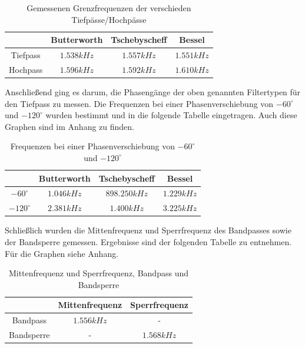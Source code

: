 	\begin{table}[h]
		\centering
		\begin{tabular}{c|c|c|c|}
					& Butterworth	& Tschebyscheff	& Bessel  \\
			\hline
			Tiefpass& $1.538kHz$	& $1.557kHz$	& $1.551kHz$  \\
			Hochpass& $1.596kHz$    & $1.592kHz$	& $1.610kHz$  \\   
		\end{tabular}
		\caption{Gemessenen Grenzfrequenzen der verschieden Tiefpässe/Hochpässe}
		\label{tab:grenzfrequnzen_hp_tp}
	\end{table}
	
\noindent Anschließend ging es darum, die Phasengänge der oben genannten Filtertypen für den Tiefpass zu messen. Die Frequenzen bei einer Phasenverschiebung von $-60^\circ$ und $-120^\circ$ wurden bestimmt und in die folgende Tabelle eingetragen. Auch diese Graphen sind im Anhang zu finden.

\begin{table}[h]
	\centering
		\begin{tabular}{c|c|c|c|}
						& Butterworth	& Tschebyscheff	& Bessel  \\
			\hline		
		    $-60^\circ $& $1.046kHz$    & $898.250kHz$	& $1.229kHz$  \\
			$-120^\circ$& $2.381kHz$    & $1.400kHz$	& $3.225kHz$  \\   
	\end{tabular}
	\caption{Frequenzen bei einer Phasenverschiebung von $-60^\circ$ und $-120^\circ$ }
	\label{tab:phasenverschiebung_hp_tp}
\end{table}
	
\noindent Schließlich wurden die Mittenfrequenz und Sperrfrequenz des Bandpasses sowie der Bandsperre gemessen. Ergebnisse sind der folgenden Tabelle zu entnehmen. Für die Graphen siehe Anhang.

\begin{table}[h]
	\centering
	\begin{tabular}{c|c|c|}
					& Mittenfrequenz & Sperrfrequenz  \\
		\hline
		Bandpass	& $1.556kHz$     & -         \\
		Bandsperre	& -              & $1.568kHz$  \\   
	\end{tabular}
	\caption{Mittenfrequenz und Sperrfrequenz, Bandpass und Bandsperre}
	\label{tab:grenzfrequnzen_bs_bp}
\end{table}

